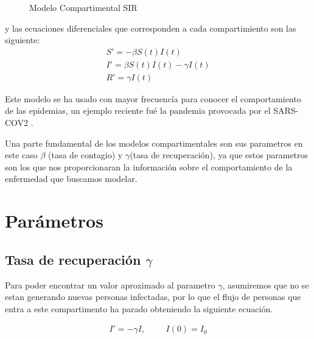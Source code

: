 \documentclass[a4paper,openany,12pt]{book}
\begin{document}
\begin{figure}[h]
\centering
{}
\caption{Modelo Compartimental SIR} \label{fig:Compartimento SIR}
\end{figure}	

y las ecuaciones diferenciales que corresponden a cada compartimiento son las siguiente: 
\begin{align}
S' = -\beta S\left(t\right)I\left(t\right)\\			
I' = \beta S\left(t\right)I\left(t\right) - \gamma I\left(t\right)\\		
R' = \gamma I\left(t\right)
\end{align}

Este modelo se ha usado con mayor frecuencía para conocer el comportamiento de las epidemias, un ejemplo reciente fué la pandemia provocada por el SARS-COV2 \cite{Martcheva}.

Una parte fundamental de los modelos compartimentales son sus parametros en este caso $\beta$ (tasa de contagio) y $\gamma$(tasa de recuperación), ya que estos parametros son los que nos proporcionaran la información sobre el comportamiento de la enfermedad que buscamos modelar.


\section{\textbf{Parámetros}}
\subsection{Tasa de recuperación \textbf{$\gamma$}}

Para poder encontrar un valor aproximado al parametro $\gamma$, asumiremos que no se estan generando nuevas personas infectadas, por lo que el flujo de personas que entra a este compartimento ha parado obteniendo la siguiente ecuación.

\begin{align}
I' = -\gamma I, \hspace{1cm} I(0) = I_{0}
\end{align}
\end{document}
